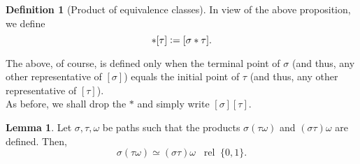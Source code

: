 \documentclass[12pt]{article}
\theoremstyle{definition}
\numberwithin{thm}{section}
\newtheorem{lem}[thm]{Lemma}
\newtheorem{defn}[thm]{Definition}
\newcommand{\rel}{\;\;\operatorname{rel}\;}
\begin{document}
\begin{defn}[Product of equivalence classes]
	In view of the above proposition, we define
	\begin{equation*} 
		[\sigma]*[\tau] \vcentcolon= [\sigma*\tau].
	\end{equation*}
\end{defn}
The above, of course, is defined only when the terminal point of $\sigma$ (and thus, any other representative of $[\sigma]$) equals the initial point of $\tau$ (and thus, any other representative of $[\tau]$).\\
As before, we shall drop the $*$ and simply write $[\sigma][\tau].$

\begin{lem} \label{lem:prodassoc}
	Let $\sigma, \tau, \omega$ be paths such that the products $\sigma(\tau\omega)$ and $(\sigma\tau)\omega$ are defined. Then,
	\begin{equation*} 
		\sigma(\tau\omega) \simeq (\sigma\tau)\omega \rel \{0, 1\}.
	\end{equation*}
\end{lem}
\end{document}
